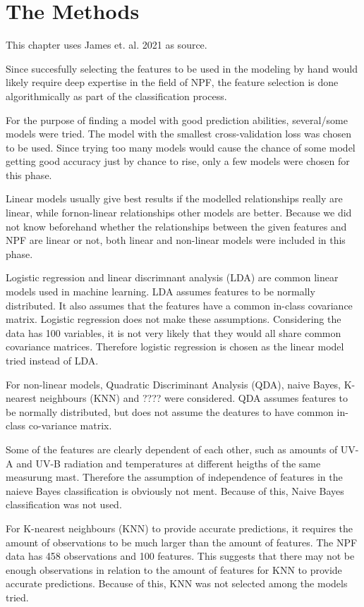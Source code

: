 \documentclass[a4size, 12pt]{report}
\begin{document}
	\chapter{The Methods}
	
	This chapter uses James et. al. 2021 as source.
		
	Since succesfully selecting the features to be used in the modeling by hand would likely  require deep expertise in the field of NPF, the feature selection is done algorithmically as part of the classification process. 	
	
	For the purpose of finding a model with good prediction abilities, several/some models were tried. The model with the smallest cross-validation loss was chosen to be used. Since trying too many models would cause the chance of some model getting good accuracy just  by chance to rise, only a few models were chosen for this phase.  
	
	Linear models usually give best results if the modelled relationships really are linear, while fornon-linear relationships other models are better. Because we did not know beforehand whether the relationships between the given features and NPF are linear or not, both linear and non-linear models were included in this phase.  
	
	Logistic regression and linear discrimnant analysis (LDA) are common linear models used in machine learning. LDA assumes features to be normally distributed. It also assumes that the features have a common in-class covariance matrix. Logistic regression does not make these assumptions. Considering the data has 100 variables, it is not very likely that they would all share common covariance matrices. Therefore logistic regression is chosen as the linear model tried instead of LDA.
	  
	
	For non-linear models, Quadratic Discriminant Analysis (QDA), naive Bayes, K-nearest neighbours (KNN) and ???? were considered. QDA assumes features to be normally distributed, but does not assume the deatures to have common in-class co-variance matrix.
	
	Some of the features are clearly dependent of each  other, such as amounts of UV-A and UV-B radiation and temperatures at different heigths of the same measurung mast. Therefore the assumption of independence of features in the naieve Bayes classification is obviously not ment. Because of this, Naive Bayes classification was not used. 
	
	For K-nearest neighbours (KNN) to provide accurate predictions, it requires the amount of observations to be much larger than the amount of features. The NPF data has 458 observations and 100 features. This suggests that there may not be enough observations in relation to the amount of features for KNN to provide accurate predictions. Because of this, KNN was not selected among the models tried.   
	
\end{document}

